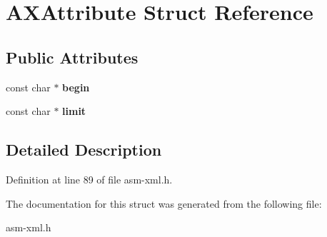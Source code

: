 \hypertarget{structAXAttribute}{\section{A\-X\-Attribute Struct Reference}
\label{structAXAttribute}
}
\subsection*{Public Attributes}
\begin{DoxyCompactItemize}
\item 
\hypertarget{structAXAttribute_aa95261aa19171f778f245e020ce9bb81}{const char $\ast$ {\bfseries begin}}\label{structAXAttribute_aa95261aa19171f778f245e020ce9bb81}

\item 
\hypertarget{structAXAttribute_acb109248f0a65ccd8f808db42cc7a3e9}{const char $\ast$ {\bfseries limit}}\label{structAXAttribute_acb109248f0a65ccd8f808db42cc7a3e9}

\end{DoxyCompactItemize}


\subsection{Detailed Description}


Definition at line 89 of file asm-\/xml.\-h.



The documentation for this struct was generated from the following file\-:\begin{DoxyCompactItemize}
\item 
asm-\/xml.\-h\end{DoxyCompactItemize}
